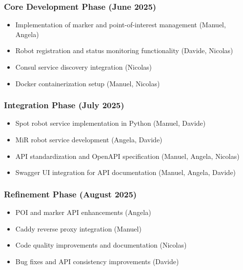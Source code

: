 \documentclass[runningheads]{llncs}
\begin{document}
%
%
%
\subsubsection{Core Development Phase (June 2025)}

\begin{itemize}
    \item Implementation of marker and point-of-interest management (Manuel, Angela)
    \item Robot registration and status monitoring functionality (Davide, Nicolas)
    \item Consul service discovery integration (Nicolas)
    \item Docker containerization setup (Manuel, Nicolas)
\end{itemize}

%
%
%
\subsubsection{Integration Phase (July 2025)}

\begin{itemize}
    \item Spot robot service implementation in Python (Manuel, Davide)
    \item MiR robot service development (Angela, Davide)
    \item API standardization and OpenAPI specification (Manuel, Angela, Nicolas)
    \item Swagger UI integration for API documentation (Manuel, Angela, Davide)
\end{itemize}

%
%
%
\subsubsection{Refinement Phase (August 2025)}

\begin{itemize}
    \item POI and marker API enhancements (Angela)
    \item Caddy reverse proxy integration (Manuel)
    \item Code quality improvements and documentation (Nicolas)
    \item Bug fixes and API consistency improvements (Davide)
\end{itemize}



%
%
%
% 
% 
%
\end{document}
